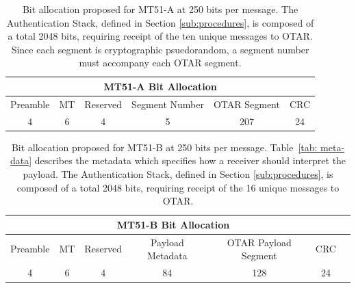 \documentclass[letterpaper,times]{IONconf/IONconf}
\begin{document}
		\begin{table}%
				\center
				\begin{tabular}{|c|c|c|c|c|c|} \hline
				\multicolumn{6}{|c|}{MT51-A Bit Allocation} \\ \hline
					Preamble & MT & Reserved & Segment Number & OTAR Segment & CRC \\ \hline
					4 & 6 & 4 & 5 & 207 & 24 \\ \hline
				\end{tabular}
				\caption{
					Bit allocation proposed for MT51-A at 250 bits per message. 
					The Authentication Stack, defined in Section \ref{sub:procedures}, is composed of a total 2048 bits, requiring receipt of the ten unique messages to OTAR.
					Since each segment is cryptographic psuedorandom, a segment number must accompany each OTAR segment.
				}
				\label{tab: mt51-a}
			\end{table}

		\begin{table}%
			\center
			\begin{tabular}{|c|c|c|c|c|c|c|} \hline
				\multicolumn{6}{|c|}{MT51-B Bit Allocation} \\ \hline
				Preamble & MT & Reserved & Payload Metadata & OTAR Payload Segment & CRC \\ \hline
				4 & 6 & 4 & 84 & 128 & 24 \\ \hline
			\end{tabular}
			\caption{
				Bit allocation proposed for MT51-B at 250 bits per message. 
				Table~\ref{tab: meta-data} describes the metadata which specifies how a receiver should interpret the payload.
				The Authentication Stack, defined in Section \ref{sub:procedures}, is composed of a total 2048 bits, requiring receipt of the 16 unique messages to OTAR.
			}
			\label{tab: mt51-b}
		\end{table}
\end{document}
